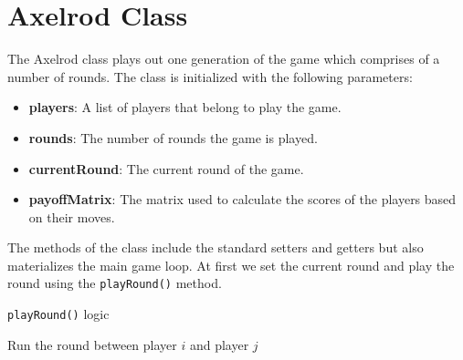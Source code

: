 \documentclass[12pt]{report}
\begin{document}
\section{Axelrod Class}
The Axelrod class plays out one generation of the game which comprises of a number of rounds. The class is initialized with the following parameters:
\begin{itemize}
    \item \textbf{players}: A list of players that belong to  play the game.
    \item \textbf{rounds}: The number of rounds the game is played.
    \item \textbf{currentRound}: The current round of the game.
    \item \textbf{payoffMatrix}: The matrix used to calculate the scores of the players based on their moves.
\end{itemize}
The methods of the class include the standard setters and getters but also materializes the main game loop. At first we set the current round and play the round using the \texttt{playRound()} method.
\begin{algorithm}
\caption{\texttt{playRound()} logic}
\begin{algorithmic}
      \State Run the round between player $i$ and player $j$
    \EndFor
  \EndFor
\end{algorithmic}
\end{algorithm}
\end{document}
